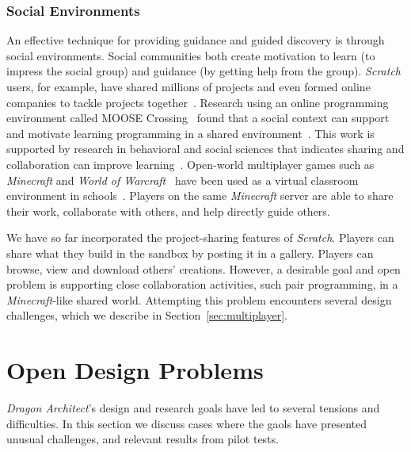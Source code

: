 \documentclass{sig-alternate}
\newcommand{\TODO}[1]{{\color{red} TODO: #1}}
\newcommand{\gametitle}{{\emph{Dragon Architect}}}
\begin{document}
\subsubsection{Social Environments}
\label{sec:social}

An effective technique for providing guidance and guided discovery is through social environments.
Social communities both create motivation to learn (to impress the social group) and guidance (by getting help from the group).
\emph{Scratch} users, for example, have shared millions of projects and even formed online companies to tackle projects together~\cite{resnick2009scratch}. 
Research using an online programming environment called MOOSE Crossing~\cite{bruckman1997moose} found that a social context can support and motivate learning programming in a shared environment~\cite{bruckman2000situated}.
This work is supported by research in behavioral and social sciences that indicates sharing and collaboration can improve learning~\cite{bransford2000people}. 
Open-world multiplayer games such as \emph{Minecraft} and \emph{World of Warcraft}~\cite{worldofwarcraft} have been used as a virtual classroom environment in schools~\cite{gillispie14from}.
Players on the same \emph{Minecraft} server are able to share their work, collaborate with others, and help directly guide others.


We have so far incorporated the project-sharing features of \emph{Scratch}.
Players can share what they build in the sandbox by posting it in a gallery.
Players can browse, view and download others' creations.
However, a desirable goal and open problem is supporting close collaboration activities, such pair programming, in a \emph{Minecraft}-like shared world.
Attempting this problem encounters several design challenges, which we describe in Section~\ref{sec:multiplayer}.

\section{Open Design Problems}
\gametitle{}'s design and research goals have led to several tensions and difficulties.
In this section we discuss cases where the gaols have presented unusual challenges, and relevant results from pilot tests.
\end{document}

